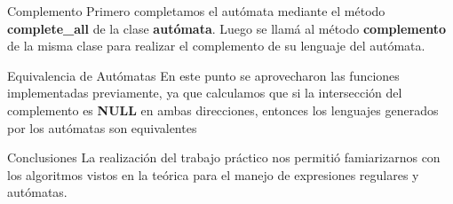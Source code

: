 \documentclass[a4paper,8pt]{article}
\begin{document}
\begin{subsection}{Complemento}
Primero completamos el autómata mediante el método \textbf{complete\_all} de la clase \textbf{autómata}.
Luego se llamá al método \textbf{complemento} de la misma clase para realizar el complemento de su lenguaje del autómata. 
\end{subsection}

\begin{subsection}{Equivalencia de Autómatas}
En este punto se aprovecharon las funciones implementadas previamente, ya que calculamos que si la intersección del complemento es \textbf{NULL} en ambas direcciones, entonces los lenguajes generados por los autómatas son equivalentes
\end{subsection}

\begin{section}{Conclusiones}
La realización del trabajo práctico nos permitió famiarizarnos con los algoritmos vistos en la teórica para el manejo de expresiones regulares y autómatas.
\end{section}
\newpage
\end{document}

